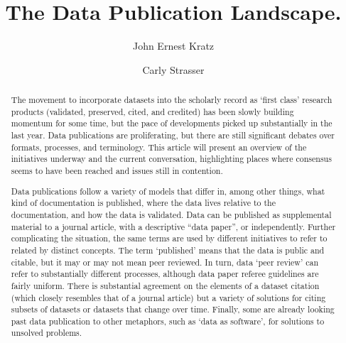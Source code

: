 \documentclass[10pt,a4paper,twocolumn]{article}
\begin{document}
\title{The Data Publication Landscape.}
\author[1]{John Ernest Kratz}
\author[1]{Carly Strasser}

\maketitle
\thispagestyle{fancy}


\begin{abstract}


The movement to incorporate datasets into the scholarly record as `first class' research products (validated, preserved, cited, and credited) has been slowly building momentum for some time, but the pace of developments picked up substantially in the last year.
Data publications are proliferating, but there are still significant debates over formats, processes, and terminology.
This article will present an overview of the initiatives underway and the current conversation, highlighting places where consensus seems to have been reached and issues still in contention.

Data publications follow a variety of models that differ in, among other things, what kind of documentation is published, where the data lives relative to the documentation, and how the data is validated.
Data can be published as supplemental material to a journal article, with a descriptive ``data paper'', or independently.
Further complicating the situation, the same terms are used by different initiatives to refer to related by distinct concepts.
The term `published' means that the data is public and citable, but it may or may not mean peer reviewed.
In turn, data `peer review' can refer to substantially different processes, although data paper referee guidelines are fairly uniform.
There is substantial agreement on the elements of a dataset citation (which closely resembles that of a journal article) but a variety of solutions for citing subsets of datasets or datasets that change over time.
Finally, some are already looking past data publication to other metaphors, such as `data as software', for solutions to unsolved problems.

\end{abstract}
\clearpage
\end{document}
